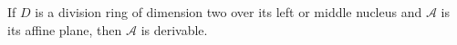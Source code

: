 If $D$ is a division ring of dimension two over its left or middle nucleus and $\mathcal{A}$ is its affine plane, then $\mathcal{A}$ is derivable.
